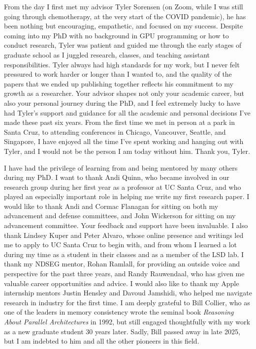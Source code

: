 
From the day I first met my advisor Tyler Sorensen (on Zoom, while I was still going through chemotherapy, at the very start of the COVID pandemic), he has been nothing but encouraging, empathetic, and focused on my success. Despite coming into my PhD with no background in GPU programming or how to conduct research, Tyler was patient and guided me through the early stages of graduate school as I juggled research, classes, and teaching assistant responsibilities. Tyler always had high standards for my work, but I never felt pressured to work harder or longer than I wanted to, and the quality of the papers that we ended up publishing together reflects his commitment to my growth as a researcher. Your advisor shapes not only your academic career, but also your personal journey during the PhD, and I feel extremely lucky to have had Tyler's support and guidance for all the academic and personal decisions I've made these past six years. From the first time we met in person at a park in Santa Cruz, to attending conferences in Chicago, Vancouver, Seattle, and Singapore, I have enjoyed all the time I've spent working and hanging out with Tyler, and I would not be the person I am today without him. Thank you, Tyler.

I have had the privilege of learning from and being mentored by many others during my PhD. I want to thank Andi Quinn, who became involved in our research group during her first year as a professor at UC Santa Cruz, and who played an especially important role in helping me write my first research paper. I would like to thank Andi and Cormac Flanagan for sitting on both my advancement and defense committees, and John Wickerson for sitting on my advancement committee. Your feedback and support have been invaluable. I also thank Lindsey Kuper and Peter Alvaro, whose online presence and writings led me to apply to UC Santa Cruz to begin with, and from whom I learned a lot during my time as a student in their classes and as a member of the LSD lab. I thank my NDSEG mentor, Rohan Ramlall, for providing an outside voice and perspective for the past three years, and Randy Rauwendaal, who has given me valuable career opportunities and advice. I would also like to thank my Apple internship mentors Justin Hensley and Davoud Jamshidi, who helped me navigate research in industry for the first time. I am deeply grateful to Bill Collier, who as one of the leaders in memory consistency wrote the seminal book \textit{Reasoning About Parallel Architectures} in 1992, but still engaged thoughtfully with my work as a new graduate student 30 years later. Sadly, Bill passed away in late 2025, but I am indebted to him and all the other pioneers in this field.

